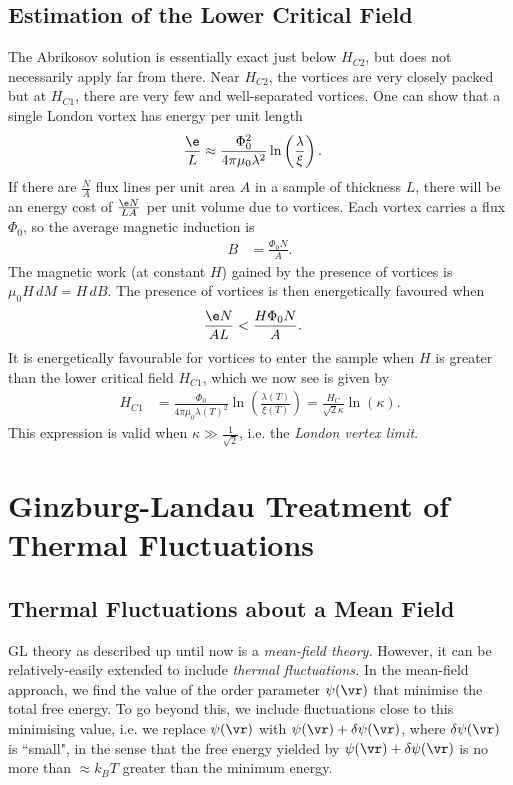 \documentclass[qo.tex]{subfiles}
\begin{document}
\section{Estimation of the Lower Critical Field}
The Abrikosov solution is essentially exact just below $H_{C2}$, but does not necessarily apply far from there. 
Near $H_{C2}$, the vortices are very closely packed but at $H_{C1}$, there are very few and well-separated vortices. 
One can show that a single London vortex has energy per unit length 
\begin{align}
    \frac{\e}{L} &\approx \frac{\Phi_0^2}{4\pi\mu_0\lambda^2}\ln\left(\frac{\lambda}{\xi}\right).
\end{align}
If there are $\frac{N}{A}$ flux lines per unit area $A$ in a sample of thickness $L$, there will be an energy cost of $\frac{\e N}{LA}$ per unit volume due to vortices. 
Each vortex carries a flux $\Phi_0$, so the average magnetic induction is 
\begin{align}
    B &= \frac{\Phi_0N}{A}.
\end{align}
The magnetic work (at constant $H$) gained by the presence of vortices is $\mu_0H\,dM = H\,dB$.
The presence of vortices is then energetically favoured when 
\begin{align}
    \frac{\e N}{AL} &< \frac{H\Phi_0N}{A}.
\end{align}
It is energetically favourable for vortices to enter the sample when $H$ is greater than the lower critical field $H_{C1}$, which we now see is given by
\begin{align}
    H_{C1} &= \frac{\Phi_0}{4\pi\mu_0\lambda(T)^2}\ln\left(\frac{\lambda(T)}{\xi(T)}\right) = \frac{H_C}{\sqrt{2}\kappa}\ln(\kappa).
\end{align}
This expression is valid when $\kappa\gg\frac{1}{\sqrt{2}}$, i.e. the \emph{London vertex limit}.

\chapter{Ginzburg-Landau Treatment of Thermal Fluctuations}
\section{Thermal Fluctuations about a Mean Field}
GL theory as described up until now is a \emph{mean-field theory.}
However, it can be relatively-easily extended to include \emph{thermal fluctuations.}
In the mean-field approach, we find the value of the order parameter $\psi(\vr)$ that minimise the total free energy. 
To go beyond this, we include fluctuations close to this minimising value, i.e. we replace $\psi(\vr)$ with $\psi(\vr)+\delta\psi(\vr)$, where $\delta\psi(\vr)$ is ``small", in the sense that the free energy yielded by $\psi(\vr)+\delta\psi(\vr)$ is no more than $\approx k_BT$ greater than the minimum energy.
\end{document}
